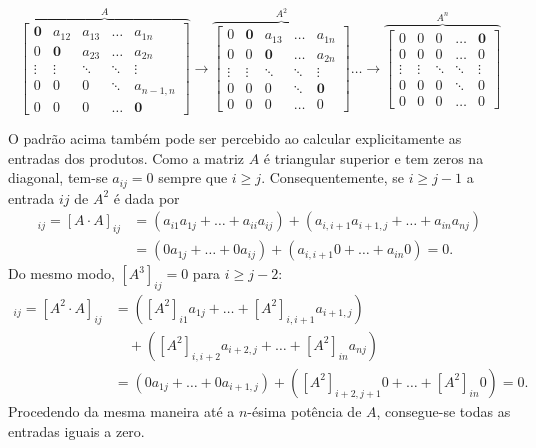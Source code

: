 \documentclass[12pt,a4paper]{article}
\begin{document}
\begin{enumerate}
\begin{enumerate}
\begin{enumerate}
\[
\overset{A}{
\overbrace{
\begin{bmatrix}
\textbf{0} &     a_{12} & a_{13} & \ldots & a_{1n} \\
         0 & \textbf{0} & a_{23} & \ldots & a_{2n} \\
    \vdots &     \vdots & \ddots & \ddots & \vdots \\
         0 &          0 &      0 & \ddots & a_{n-1,n} \\
         0 &          0 &      0 & \ldots & \textbf{0}
\end{bmatrix}
}}
\rightarrow
\overset{A^2}{
\overbrace{
\begin{bmatrix}
         0 & \textbf{0} & a_{13} & \ldots & a_{1n} \\
         0 &          0 & \textbf{0} & \ldots & a_{2n} \\
    \vdots &     \vdots &     \ddots & \ddots & \vdots \\
         0 &          0 &          0 & \ddots & \textbf{0} \\
         0 &          0 &          0 & \ldots & 0
\end{bmatrix}
}}
\ldots \rightarrow
\overset{A^n}{
\overbrace{
\begin{bmatrix}
         0 &          0 &          0 & \ldots & \textbf{0} \\
         0 &          0 &          0 & \ldots & 0 \\
    \vdots &     \vdots &     \ddots & \ddots & \vdots \\
         0 &          0 &          0 & \ddots & 0 \\
         0 &          0 &          0 & \ldots & 0
\end{bmatrix}
}}
\]

O padrão acima também pode ser percebido ao calcular explicitamente as entradas dos produtos. Como a matriz $A$ é triangular superior e tem zeros na diagonal, tem-se $a_{ij} = 0$ sempre que $i \geq j$. Consequentemente, se $i \geq j-1$ a entrada $ij$ de $A^2$ é dada por
\begin{align*}
[A^2]_{ij}
  = [A \cdot A]_{ij}
& = (a_{i1} a_{1j}       + \ldots + a_{ii} a_{ij})
  + (a_{i,i+1} a_{i+1,j} + \ldots + a_{in} a_{nj}) \\
& = (0 a_{1j}       + \ldots + 0 a_{ij})
  + (a_{i,i+1} 0 + \ldots + a_{in} 0)
  = 0.
\end{align*}
Do mesmo modo, $[A^3]_{ij} = 0$ para $i \geq j-2$:
\begin{align*}
[A^3]_{ij}
  = [A^2 \cdot A]_{ij}
& = ([A^2]_{i1} a_{1j} + \ldots + [A^2]_{i,i+1} a_{i+1,j}) \\
& \quad + ([A^2]_{i,i+2} a_{i+2,j} + \ldots + [A^2]_{in} a_{nj}) \\
& = (0 a_{1j}       + \ldots + 0 a_{i+1,j})
  + ([A^2]_{i+2,j+1} 0 + \ldots + [A^2]_{in} 0)
  = 0.
\end{align*}
Procedendo da mesma maneira até a $n$-ésima potência de $A$, consegue-se todas as entradas iguais a zero.
\end{enumerate}
\end{enumerate}


\end{enumerate}
\end{document}

